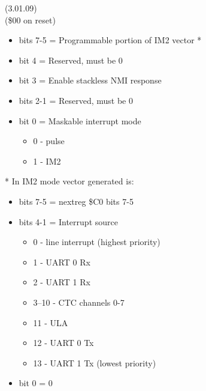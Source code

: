  (3.01.09)\\
(\$00 on reset)
\begin{itemize}
\item bits 7-5 = Programmable portion of IM2 vector *
\item bit 4 = Reserved, must be 0
\item bit 3 = Enable stackless NMI response
\item bits 2-1 = Reserved, must be 0
\item bit 0 = Maskable interrupt mode
\begin{itemize}
\item[] 0 - pulse
\item[] 1 - IM2
\end{itemize}
\end{itemize}
* In IM2 mode vector generated is:
\begin{itemize}
\item bits 7-5 = nextreg \$C0 bits 7-5
\item bits 4-1 = Interrupt source
\begin{itemize}
\item[] 0 - line interrupt (highest priority)
\item[] 1 - UART 0 Rx
\item[] 2 - UART 1 Rx
\item[] 3--10 - CTC channels 0-7
\item[] 11 - ULA
\item[] 12 - UART 0 Tx
\item[] 13 - UART 1 Tx (lowest priority)
\end{itemize}
\item bit 0 = 0
\end{itemize}

